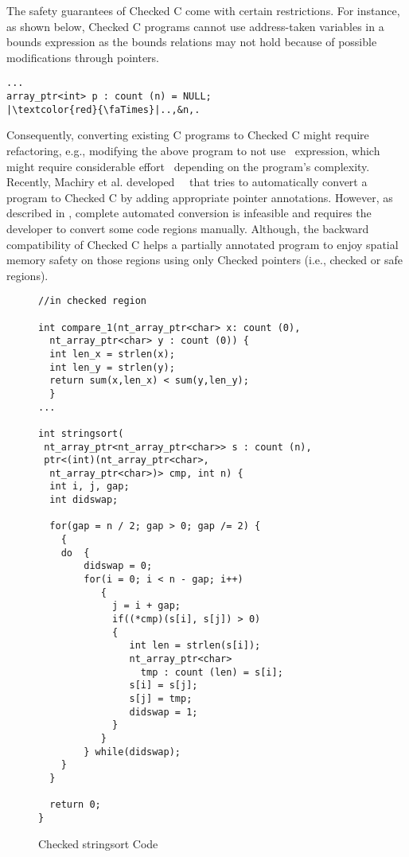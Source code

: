 %
The safety guarantees of Checked C come with certain restrictions. For instance, as shown below, Checked C programs cannot use address-taken variables in a bounds expression as the bounds relations may not hold because of possible modifications through pointers.
\begin{verbatim}
...
array_ptr<int> p : count (n) = NULL;
|\textcolor{red}{\faTimes}|..,&n,.
\end{verbatim}
Consequently, converting existing C programs to Checked C might require refactoring, e.g., modifying the above program to not use~ expression, which might require considerable effort~\cite{duanrefactoring} depending on the program's complexity. 
Recently, Machiry et al. developed~\threec~\cite{machiry2022c} that tries to automatically convert a program to Checked C by adding appropriate pointer annotations.
However, as described in \threec, complete automated conversion is infeasible and requires the developer to convert some code regions manually.
Although, the backward compatibility of Checked C helps a partially annotated program to enjoy spatial memory safety on those regions using only Checked pointers (i.e., checked or safe regions).

\begin{figure}[t]
{\small
  \begin{lstlisting}[xleftmargin=4 mm]
//in checked region

int compare_1(nt_array_ptr<char> x: count (0),
  nt_array_ptr<char> y : count (0)) { 
  int len_x = strlen(x);
  int len_y = strlen(y);
  return sum(x,len_x) < sum(y,len_y);
  }
...

int stringsort(
 nt_array_ptr<nt_array_ptr<char>> s : count (n),
 ptr<(int)(nt_array_ptr<char>,
  nt_array_ptr<char>)> cmp, int n) {
  int i, j, gap;
  int didswap;
 
  for(gap = n / 2; gap > 0; gap /= 2) {
    {
    do  {
        didswap = 0;
        for(i = 0; i < n - gap; i++)
           {
             j = i + gap;
             if((*cmp)(s[i], s[j]) > 0)
             {
                int len = strlen(s[i]);
                nt_array_ptr<char> 
                  tmp : count (len) = s[i];
                s[i] = s[j];
                s[j] = tmp;
                didswap = 1;
             }
           }
        } while(didswap);
    }
  }

  return 0;
}
  \end{lstlisting}
}
\caption{Checked stringsort Code}
\label{fig:checkedc-example-1}
\end{figure}

